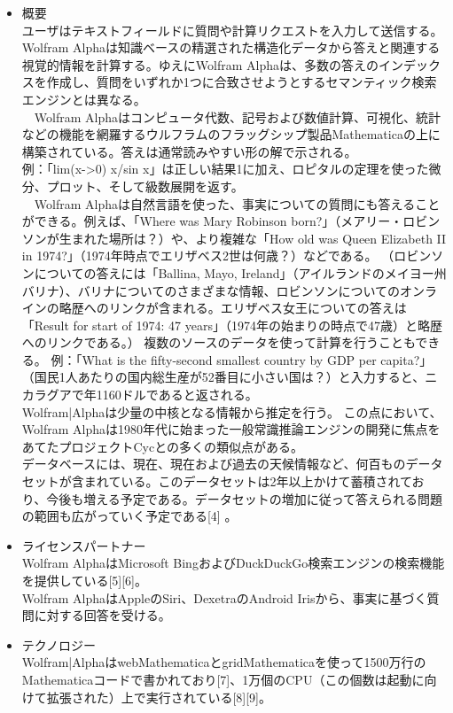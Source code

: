 \documentclass[12pt]{jsarticle}
\begin{document}
\begin{itemize}

\item 概要\\
ユーザはテキストフィールドに質問や計算リクエストを入力して送信する。Wolfram Alphaは知識ベースの精選された構造化データから答えと関連する視覚的情報を計算する。ゆえにWolfram Alphaは、多数の答えのインデックスを作成し、質問をいずれか1つに合致させようとするセマンティック検索エンジンとは異なる。\\
　Wolfram Alphaはコンピュータ代数、記号および数値計算、可視化、統計などの機能を網羅するウルフラムのフラッグシップ製品Mathematicaの上に構築されている。答えは通常読みやすい形の解で示される。\\
例：「lim(x->0) x/sin x」は正しい結果1に加え、ロピタルの定理を使った微分、プロット、そして級数展開を返す。\\
　Wolfram Alphaは自然言語を使った、事実についての質問にも答えることができる。例えば、「Where was Mary Robinson born?」（メアリー・ロビンソンが生まれた場所は？）や、より複雑な「How old was Queen Elizabeth II in 1974?」（1974年時点でエリザベス2世は何歳？）などである。 （ロビンソンについての答えには「Ballina, Mayo, Ireland」（アイルランドのメイヨー州バリナ）、バリナについてのさまざまな情報、ロビンソンについてのオンラインの略歴へのリンクが含まれる。エリザベス女王についての答えは「Result for start of 1974: 47 years」（1974年の始まりの時点で47歳）と略歴へのリンクである。）
複数のソースのデータを使って計算を行うこともできる。
例：「What is the fifty-second smallest country by GDP per capita?」（国民1人あたりの国内総生産が52番目に小さい国は？）と入力すると、ニカラグアで年1160ドルであると返される。\\
Wolfram|Alphaは少量の中核となる情報から推定を行う。 この点において、Wolfram Alphaは1980年代に始まった一般常識推論エンジンの開発に焦点をあてたプロジェクトCycとの多くの類似点がある。\\
データベースには、現在、現在および過去の天候情報など、何百ものデータセットが含まれている。このデータセットは2年以上かけて蓄積されており、今後も増える予定である。データセットの増加に従って答えられる問題の範囲も広がっていく予定である[4] 。

\item ライセンスパートナー\\
Wolfram AlphaはMicrosoft BingおよびDuckDuckGo検索エンジンの検索機能を提供している[5][6]。\\
Wolfram AlphaはAppleのSiri、DexetraのAndroid Irisから、事実に基づく質問に対する回答を受ける。\\
\item テクノロジー\\
Wolfram|AlphaはwebMathematicaとgridMathematicaを使って1500万行のMathematicaコードで書かれており[7]、1万個のCPU（この個数は起動に向けて拡張された）上で実行されている[8][9]。


\end{itemize}
\end{document}
